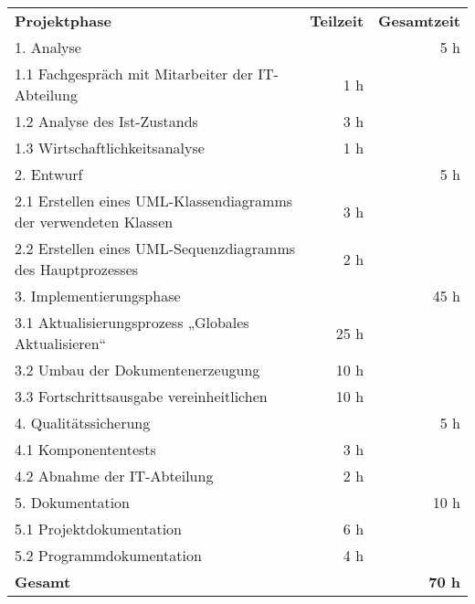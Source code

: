 \begin{tabular}{lrr}
\rowcolor{heading}\textbf{Projektphase} & \textbf{Teilzeit} & \textbf{Gesamtzeit} \\
1. Analyse & & 5 h \\
\rowcolor{odd}1.1 Fachgespräch mit Mitarbeiter der IT-Abteilung & 1 h & \\
1.2 Analyse des Ist-Zustands & 3 h & \\
\rowcolor{odd}1.3 Wirtschaftlichkeitsanalyse & 1 h & \\

2. Entwurf & & 5 h \\
\rowcolor{odd}2.1 Erstellen eines \acs{UML}-Klassendiagramms der verwendeten Klassen & 3 h & \\
2.2 Erstellen eines \acs{UML}-Sequenzdiagramms des Hauptprozesses & 2 h & \\

\rowcolor{odd}3. Implementierungsphase & & 45 h \\
3.1 Aktualisierungsprozess „Globales Aktualisieren“ & 25 h & \\
\rowcolor{odd}3.2 Umbau der Dokumentenerzeugung & 10 h & \\
3.3 Fortschrittsausgabe  vereinheitlichen & 10 h & \\

\rowcolor{odd}4. Qualitätssicherung & & 5 h \\
4.1 Komponententests & 3 h & \\
\rowcolor{odd}4.2 Abnahme der IT-Abteilung & 2 h & \\

5. Dokumentation & & 10 h \\
\rowcolor{odd}5.1 Projektdokumentation & 6 h & \\
5.2 Programmdokumentation & 4 h & \\
\hline
\rowcolor{heading}\textbf{Gesamt} & & \textbf{70 h} \\
\end{tabular}
